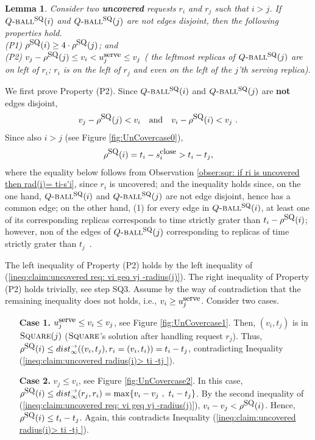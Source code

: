 \documentclass[11pt]{article}
\newtheorem{lem}[theorem]{Lemma}
\def\proof{\par\noindent{\bf Proof:~}}
\newcommand{\Square}[0]{\mbox{\sc Square}}
\newcommand{\rr}{r}
\newcommand{\distinf}[1]{{dist}^{\rightarrow}_{\infty}(#1)}
\newcommand{\uSQ}{u^{\mbox{\small\upshape serve}}}
\newcommand{\sclose}{s^{\mbox{\small\upshape close}}}
\newcommand{\rhoSQ}[0]{\rho^{\mbox{\small\upshape SQ}}}
\newcommand{\SQball}[0]{Q{\mbox{\sc -ball}}^{\mbox{\sc sq}}}
\begin{document}
\begin{lem}
Consider two {\bf uncovered} requests $\rr_i$ and $\rr_j$ such that $i>j$.
If $\SQball(i)$ and $\SQball(j)$
are not edges disjoint, then
the following properties hold.\\
(P1) $\rhoSQ(i)\geq 4\cdot\rhoSQ(j)$; and\\
(P2) $v_j-\rhoSQ(j) \leq v_i<\uSQ_j\leq v_j$ (
the leftmost replicas of $\SQball(j)$ are on left of $\rr_i$; $\rr_i$ is on the left of $\rr_j$ and even on the left of the $j$'th serving replica).
\label{lemma:square:uncoverd req not edegs disjoint}
\end{lem}
\proof
We first prove Property (P2).
Since $\SQball(i)$ and $\SQball(j)$ are {\bf not} edges disjoint,
\begin{eqnarray}
 v_j-\rhoSQ(j)<v_i ~~\mbox{ and }~~   v_i-\rhoSQ(i) < v_j~.
 \label{ineq:claim:uncovered req: vi geq vj -radius(j)}
\end{eqnarray}
Since also $i>j$ (see Figure \ref{fig:UnCovercase0}),
\begin{eqnarray}
\rhoSQ(i)=t_i-\sclose_i > t_i-t_j,
 \label{ineq:claim:uncovered radius(i)> ti -tj }
\end{eqnarray}
where the equality below follows from Observation \ref{obser:sqr: if ri is uncovered then rad(i)= ti-s'i},
since $r_i$ is uncovered; and
the inequality holds since, on the one hand,  $\SQball(i)$ and $\SQball(j)$ are not edge disjoint, hence has a common edge;
on the other hand, (1) for every edge in $\SQball(i)$, at least one of its corresponding replicas corresponds to time strictly grater than $t_i-\rhoSQ(i)$;
however, non of the edges of $\SQball(j)$ corresponding to replicas of time strictly grater than $t_j$~.



The left inequality of Property (P2) holds by the left inequality of (\ref{ineq:claim:uncovered req: vi geq vj -radius(j)}).
The right inequality of Property (P2) holds trivially, see step SQ3.
Assume by the way of contradiction that the remaining inequality does not holds, i.e., $v_i\geq \uSQ_j$.
Consider two cases.\\


\begin{itemize}

\item [{\bf Case 1.}] $\uSQ_j \leq v_i\leq v_j$, see Figure \ref{fig:UnCovercase1}.
Then, $(v_i,t_j)$ is in $\Square(j)$ ($\Square$'s solution after handling request $\rr_j$).
Thus, $\rhoSQ(i)\leq\distinf{(v_i,t_j),r_i=(v_i,t_i)} = t_i-t_j$, contradicting Inequality (\ref{ineq:claim:uncovered radius(i)> ti -tj }).

\item [{\bf Case 2.}]  $v_j\leq v_i$, see Figure \ref{fig:UnCovercase2}.
In this case, $\rhoSQ(i)\leq\distinf{r_j,r_i}=\max\{v_i-v_j ~,~ t_i-t_j\}$.
By the second inequality of (\ref{ineq:claim:uncovered req: vi geq vj -radius(j)}), $v_i-v_j < \rhoSQ(i)$.
Hence, $\rhoSQ(i)\leq t_i-t_j$.
Again, this contradicts Inequality (\ref{ineq:claim:uncovered radius(i)> ti -tj }).

\end{itemize}
\end{document}
